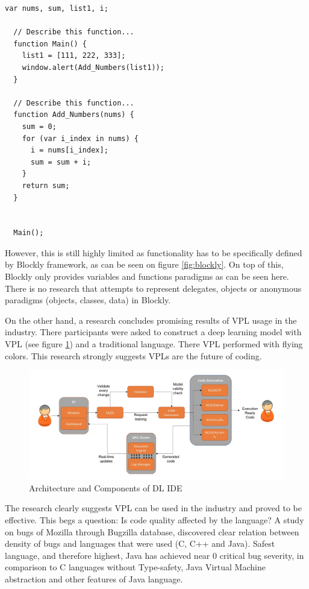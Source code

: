 \documentclass{article}
\begin{document}
\pagebreak

\begin{lstlisting}[frame=single, label=jsout, caption=Generated JavaScript Code]
  var nums, sum, list1, i;
  
  // Describe this function...
  function Main() {
    list1 = [111, 222, 333];
    window.alert(Add_Numbers(list1));
  }
  
  // Describe this function...
  function Add_Numbers(nums) {
    sum = 0;
    for (var i_index in nums) {
      i = nums[i_index];
      sum = sum + i;
    }
    return sum;
  }
  
  
  Main();
\end{lstlisting}


However, this is still highly limited as functionality has to be specifically defined by Blockly framework, as can be seen on figure \ref{fig:blockly}. On top of this, Blockly only provides variables and functions paradigms as can be seen here. There is no research that attempts to represent delegates, objects or anonymous paradigms (objects, classes, data) in Blockly.

On the other hand, a research \citep{10.1145/3364183.3364202} concludes promising results of VPL usage in the industry. There participants were asked to construct a deep learning model with VPL (see figure \ref{fig:dl-ide}) and a traditional language. There VPL performed with flying colors. This research strongly suggests VPLs are the future of coding.

\begin{figure}[H]
\centering
\includegraphics[width=1\textwidth]{Screenshot 2021-05-21 at 06.02.17.png}
\caption{Architecture and Components of DL IDE}
\label{fig:dl-ide}
\end{figure}

The research \citep{10.1145/3364183.3364202} clearly suggests VPL can be used in the industry and proved to be effective. This begs a question: Is code quality affected by the language? A study \citep{5298423} on bugs of Mozilla through Bugzilla database, discovered clear relation between density of bugs and languages that were used (C, C++ and Java). Safest language, and therefore highest, Java has achieved near 0 critical bug severity, in comparison to C languages without Type-safety, Java Virtual Machine abstraction and other features of Java language.
\end{document}
